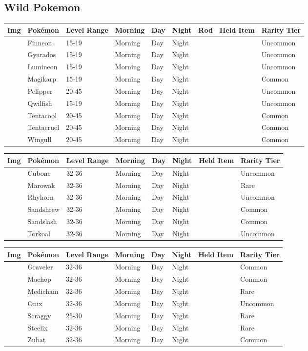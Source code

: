 \subsection{Wild Pokemon}%
\label{subsec:WildPokemon}%
\begin{longtable}{||l l l l l l l l l||}%
\hline%
Img&Pokémon&Level Range&Morning&Day&Night&Rod&Held Item&Rarity Tier\\%
\hline%
\endhead%
\hline%
&Finneon&15{-}19&Morning&Day&Night&&&Uncommon\\%
\hline%
&Gyarados&15{-}19&Morning&Day&Night&&&Uncommon\\%
\hline%
&Lumineon&15{-}19&Morning&Day&Night&&&Uncommon\\%
\hline%
&Magikarp&15{-}19&Morning&Day&Night&&&Common\\%
\hline%
&Pelipper&20{-}45&Morning&Day&Night&&&Uncommon\\%
\hline%
&Qwilfish&15{-}19&Morning&Day&Night&&&Uncommon\\%
\hline%
&Tentacool&20{-}45&Morning&Day&Night&&&Common\\%
\hline%
&Tentacruel&20{-}45&Morning&Day&Night&&&Common\\%
\hline%
&Wingull&20{-}45&Morning&Day&Night&&&Common\\%
\hline%
\end{longtable}%
\begin{longtable}{||l l l l l l l l||}%
\hline%
Img&Pokémon&Level Range&Morning&Day&Night&Held Item&Rarity Tier\\%
\hline%
\endhead%
\hline%
&Cubone&32{-}36&Morning&Day&Night&&Uncommon\\%
\hline%
&Marowak&32{-}36&Morning&Day&Night&&Rare\\%
\hline%
&Rhyhorn&32{-}36&Morning&Day&Night&&Uncommon\\%
\hline%
&Sandshrew&32{-}36&Morning&Day&Night&&Common\\%
\hline%
&Sandslash&32{-}36&Morning&Day&Night&&Common\\%
\hline%
&Torkoal&32{-}36&Morning&Day&Night&&Uncommon\\%
\hline%
\end{longtable}%
\begin{longtable}{||l l l l l l l l||}%
\hline%
Img&Pokémon&Level Range&Morning&Day&Night&Held Item&Rarity Tier\\%
\hline%
\endhead%
\hline%
&Graveler&32{-}36&Morning&Day&Night&&Common\\%
\hline%
&Machop&32{-}36&Morning&Day&Night&&Common\\%
\hline%
&Medicham&32{-}36&Morning&Day&Night&&Rare\\%
\hline%
&Onix&32{-}36&Morning&Day&Night&&Uncommon\\%
\hline%
&Scraggy&25{-}30&Morning&Day&Night&&Rare\\%
\hline%
&Steelix&32{-}36&Morning&Day&Night&&Rare\\%
\hline%
&Zubat&32{-}36&Morning&Day&Night&&Common\\%
\hline%
\end{longtable}%
